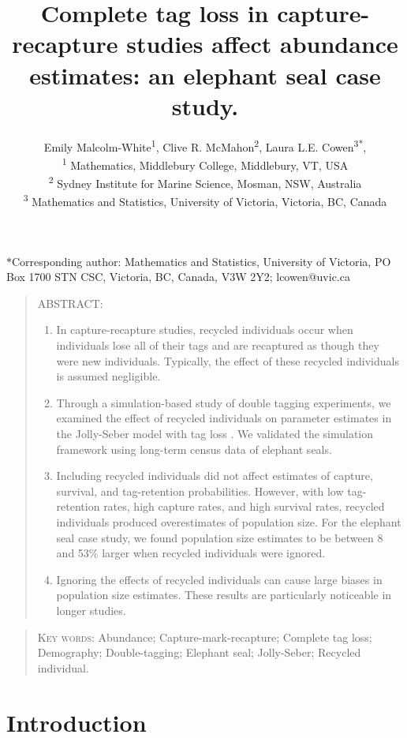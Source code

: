 \documentclass[12pt]{article}
\title{Complete tag loss in capture-recapture studies affect abundance estimates: an elephant seal case study.}
\author{Emily Malcolm-White\textsuperscript{1},
        Clive R. McMahon\textsuperscript{2}, 
        Laura L.E. Cowen\textsuperscript{3*}, 
        \\ 
        \textsuperscript{1} Mathematics, Middlebury College, Middlebury, VT, USA\\ 
        \textsuperscript{2} Sydney Institute for Marine Science, Mosman, NSW, Australia\\
       \textsuperscript{3} Mathematics and Statistics, University of Victoria, Victoria, BC, Canada}
\date{}
\begin{document}
\maketitle

$*$Corresponding author: Mathematics and Statistics, University of Victoria,
       PO Box 1700 STN CSC, Victoria, BC, Canada, V3W 2Y2; lcowen@uvic.ca
\newpage

\begin{quote}
\textsc{ABSTRACT:} 
\begin{enumerate}
	\item In capture-recapture studies, recycled individuals occur
when individuals lose all of their tags and are recaptured as though they were new
individuals. Typically, the effect of these recycled individuals is
assumed negligible. 

	\item Through a simulation-based study of double tagging experiments, we examined the
effect of recycled individuals on parameter estimates in the
Jolly-Seber model with tag loss \citep{Cowen:2006}. We validated the simulation
framework using long-term census data of elephant seals.

	\item  Including recycled individuals did not affect estimates of capture, survival, and tag-retention probabilities. However, with low tag-retention
rates, high capture rates, and high survival rates, recycled individuals produced overestimates of population size. For the elephant seal case study, we found population size estimates to be between 8 and 53\% larger when recycled individuals were ignored. 

	\item Ignoring the effects of recycled individuals can cause large biases in population size estimates. These results are particularly noticeable in longer studies.
	\end{enumerate} 
\end{quote}

\begin{quote}
\begin{center} \textsc{Key words:} Abundance; Capture-mark-recapture; Complete tag loss;  Demography; Double-tagging; Elephant seal; Jolly-Seber; Recycled individual. 
\end{center}
\end{quote}



\section{Introduction}\label{introduction}
\end{document}
